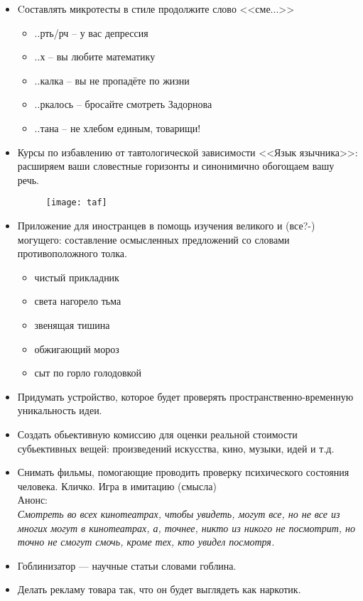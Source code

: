 \begin{itemize}
    \pagebreak

    \item Cоставлять микротесты в стиле продолжите слово <<сме...>>
    \begin{itemize}
        \item[] ..рть/рч -- у вас депрессия
        \item[] ..х -- вы любите математику
        \item[] ..калка -- вы не пропадёте по жизни
        \item[] ..ркалось -- бросайте смотреть Задорнова
        \item[] ..тана -- не хлебом единым, товарищи!
    \end{itemize}
    \item Курсы по избавлению от тавтологической зависимости <<Язык язычника>>: расширяем ваши словестные горизонты и синонимично обогощаем вашу речь.
    \begin{figure}[ht!]
        \centering
        \texttt{[image: taf]}
    \end{figure}
    \item Приложение для иностранцев в помощь изучения великого и (все?-) могущего: составление осмысленных предложений со словами противоположного толка.
        \begin{itemize}
            \item чистый прикладник
            \item света нагорело тьма
            \item звенящая тишина
            \item обжигающий мороз
            \item сыт по горло голодовкой
        \end{itemize}
    \item Придумать устройство, которое будет проверять пространственно-временную уникальность идеи.
    \item Создать обьективную комиссию для оценки реальной стоимости субьективных вещей: произведений искусства, кино, музыки, идей и т.д.
    \item Снимать фильмы, помогающие проводить проверку психического состояния человека.
    Кличко. Игра в имитацию (смысла) \\
    Анонс:\\
    \emph{Смотреть во всех кинотеатрах, чтобы увидеть, могут все, но не все из многих могут в кинотеатрах, а, точнее, никто из никого не посмотрит, но точно не смогут смочь, кроме тех, кто увидел посмотря.}
    \item Гоблинизатор --- научные статьи словами гоблина.
    \item Делать рекламу товара так, что он будет выглядеть как наркотик.


\end{itemize}
